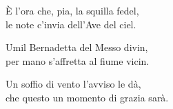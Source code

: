 
\strofa È l'ora che, pia, la squilla fedel,\\
le note c'invia dell'Ave del ciel.
\spazio

 

\spazio

\strofa Umil Bernadetta del Messo divin,\\
per mano s'affretta al fiume vicin.

\spazio

 

\spazio

\strofa Un soffio di vento l'avviso le dà,\\
che questo un momento di grazia sarà.

\spazio

 